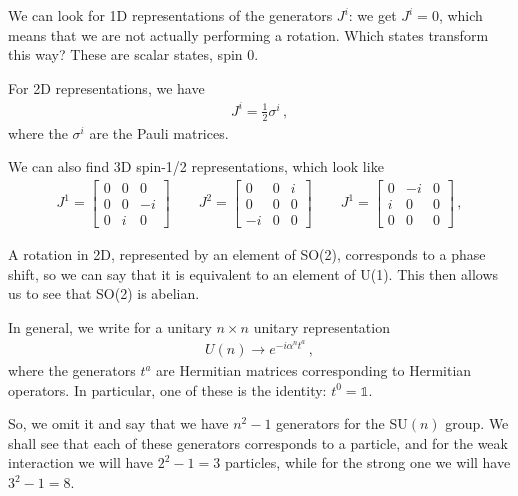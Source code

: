 \documentclass[main.tex]{subfiles}
\begin{document}
We can look for 1D representations of the generators \(J^{i}\): we get \(J^{i} = 0\), which means that we are not actually performing a rotation.
Which states transform this way? These are scalar states, spin 0. 

For 2D representations, we have 
%
\begin{align}
J^{i} =\frac{1}{2} \sigma^{i} 
\,,
\end{align}
%
where the \(\sigma^{i}\) are the Pauli matrices.

We can also find 3D spin-1/2 representations, which look like 
%
\begin{align}
J^{1}= \left[\begin{array}{ccc}
0 & 0 & 0 \\ 
0 & 0 & -i \\ 
0 & i & 0
\end{array}\right] 
\qquad 
J^{2}= \left[\begin{array}{ccc}
0 & 0 & i \\ 
0 & 0 & 0 \\ 
-i & 0 & 0
\end{array}\right] 
\qquad 
J^{1}= \left[\begin{array}{ccc}
0 & -i & 0 \\ 
i & 0 & 0 \\ 
0 & 0 & 0
\end{array}\right] 
\,,
\end{align}
%


A rotation in 2D, represented by an element of SO(2), corresponds to a phase shift, so we can say that it is equivalent to an element of U(1).
This then allows us to see that SO(2) is abelian. 

In general, we write for a unitary \(n \times n\) unitary representation
%
\begin{align}
U(n) \rightarrow e^{-i \alpha^{n} t^{a}}
\,,
\end{align}
%
where the generators \(t^{a}\) are Hermitian matrices corresponding to Hermitian operators. 
In particular, one of these is the identity: \(t^{0} = \mathbb{1}\). 

So, we omit it and  say that we have \(n^2-1\) generators for the SU\((n)\) group.
We shall see that each of these generators corresponds to a particle, and for the weak interaction we will have \(2^2-1 = 3\) particles, while for the strong one we will have \(3^2-1=8\). 
\end{document}
